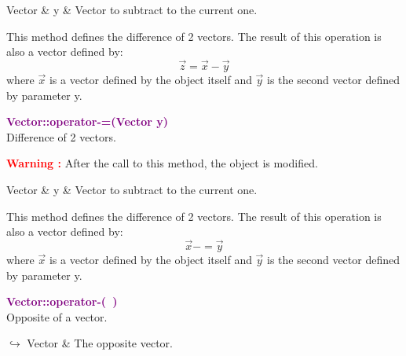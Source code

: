 \begin{tcolorbox}[width=\textwidth,myArgs,tabularx={ll|R}]
Vector & y & Vector to subtract to the current one.
\end{tcolorbox}

This method defines the difference of 2 vectors.
The result of this operation is also a vector defined by:
\begin{equation*}
\overrightarrow{z}=\overrightarrow{x}-\overrightarrow{y}
\end{equation*}
where $\overrightarrow{x}$ is a vector defined by the object itself and $\overrightarrow{y}$ is the second vector defined by parameter y.

\textcolor{purple}{\textbf{Vector::operator-=(Vector y)}}\label{Vector::operator-=(Vector y)}\\
Difference of 2 vectors.

\hspace*{10mm}\textcolor{red}{\textbf{Warning :}} After the call to this method, the object is modified.

\begin{tcolorbox}[width=\textwidth,myArgs,tabularx={ll|R}]
Vector & y & Vector to subtract to the current one.
\end{tcolorbox}

This method defines the difference of 2 vectors.
The result of this operation is also a vector defined by:
\begin{equation*}
\overrightarrow{x}-=\overrightarrow{y}
\end{equation*}
where $\overrightarrow{x}$ is a vector defined by the object itself and $\overrightarrow{y}$ is the second vector defined by parameter y.

\textcolor{purple}{\textbf{Vector::operator-(~)}}\label{Vector::operator-()}\\
Opposite of a vector.\vspace*{-0.5em}
\begin{tcolorbox}[grow to left by=-1cm, width=\textwidth-1cm,myArgs,tabularx={l|R}]
$\hookrightarrow$ Vector & The opposite vector.
\end{tcolorbox}

